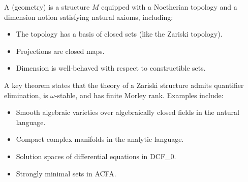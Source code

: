 A  (geometry) is a structure $M$ equipped with a Noetherian topology and a dimension notion satisfying natural axioms, including:
\begin{itemize}
\item The topology has a basis of closed sets (like the Zariski topology).
\item Projections are closed maps.
\item Dimension is well-behaved with respect to constructible sets.
\end{itemize}
A key theorem states that the theory of a Zariski structure admits quantifier elimination, is $\omega$-stable, and has finite Morley rank. Examples include:
\begin{itemize}
\item Smooth algebraic varieties over algebraically closed fields in the natural language.
\item Compact complex manifolds in the analytic language.
\item Solution spaces of differential equations in DCF_0.
\item Strongly minimal sets in ACFA.
\end{itemize}
